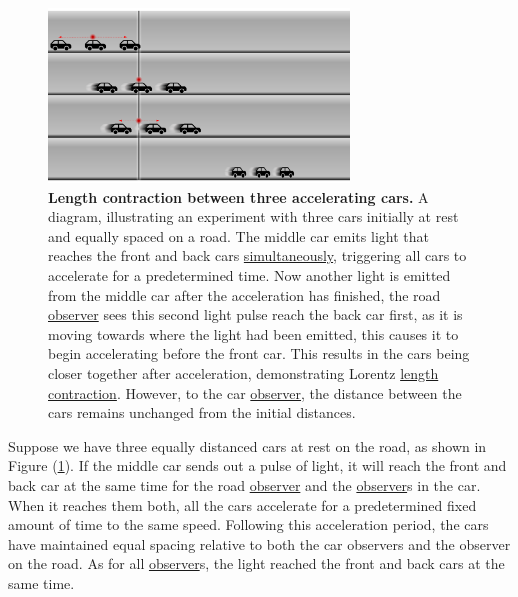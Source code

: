 \begin{figure}[H]
	\centering
	\includegraphics[width = 8cm]{images/pdf/cars.pdf}
	\caption{\textbf{Length contraction between three accelerating cars.} A diagram, illustrating an experiment with three cars initially at rest and equally spaced on a road. The middle car emits light that reaches the front and back cars \protect\hyperlink{def-simultaneity}{simultaneously}, triggering all cars to accelerate for a predetermined time. Now another light is emitted from the middle car after the acceleration has finished, the road \protect\hyperlink{def-observer}{observer} sees this second light pulse reach the back car first, as it is moving towards where the light had been emitted, this causes it to begin accelerating before the front car. This results in the cars being closer together after acceleration, demonstrating Lorentz \protect\hyperlink{def-length-contraction}{length contraction}. However, to the car \protect\hyperlink{def-observer}{observer}, the distance between the cars remains unchanged from the initial distances.}
	\label{fig: cars}
\end{figure}

Suppose we have three equally distanced cars at rest on the road, as shown in Figure (\ref{fig: cars}).
If the middle car sends out a pulse of light, it will reach the front and back car at the same time for the road \hyperlink{def-observer}{observer} and the \hyperlink{def-observer}{observer}s in the car. When it reaches them both, all the cars accelerate for a predetermined fixed amount of time to the same speed.
Following this acceleration period, the cars have maintained equal spacing relative to both the car observers and the observer on the road.
As for all \hyperlink{def-observer}{observer}s, the light reached the front and back cars at the same time.

